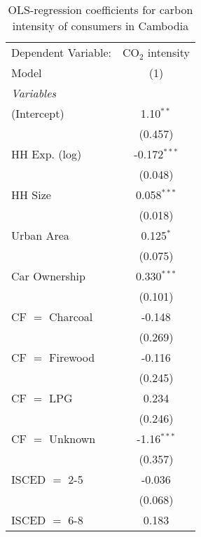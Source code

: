 
\begin{table}[htbp!]
   \centering
   \small
   \begin{adjustbox}{width = 1\textwidth, max height = 0.95\textheight, center}
      \begin{threeparttable}[b]
         \caption{\label{tab:OLS_1_KHM} OLS-regression coefficients for carbon intensity of consumers in Cambodia}
         \begin{tabular}{lc}
            \tabularnewline \midrule \midrule
            Dependent Variable: & CO$_{2}$ intensity\\  
            Model               & (1)\\  
            \midrule
            \emph{Variables}\\
            (Intercept)         & 1.10$^{**}$\\   
                                & (0.457)\\   
            HH Exp. (log)       & -0.172$^{***}$\\   
                                & (0.048)\\   
            HH Size             & 0.058$^{***}$\\   
                                & (0.018)\\   
            Urban Area          & 0.125$^{*}$\\   
                                & (0.075)\\   
            Car Ownership       & 0.330$^{***}$\\   
                                & (0.101)\\   
            CF $=$ Charcoal     & -0.148\\   
                                & (0.269)\\   
            CF $=$ Firewood     & -0.116\\   
                                & (0.245)\\   
            CF $=$ LPG          & 0.234\\   
                                & (0.246)\\   
            CF $=$ Unknown      & -1.16$^{***}$\\   
                                & (0.357)\\   
            ISCED $=$ 2-5       & -0.036\\   
                                & (0.068)\\   
            ISCED $=$ 6-8       & 0.183\\   

\end{tabular}
\end{threeparttable}
\end{adjustbox}
\end{table}
